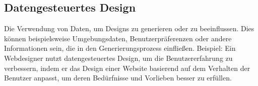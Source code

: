 \subsection*{Datengesteuertes Design}
Die Verwendung von Daten, um Designs zu generieren oder zu beeinflussen. Dies können beispielsweise Umgebungsdaten, Benutzerpräferenzen oder andere Informationen sein, die in den Generierungsprozess einfließen. Beispiel: Ein Webdesigner nutzt datengesteuertes Design, um die Benutzererfahrung zu verbessern, indem er das Design einer Website basierend auf dem Verhalten der Benutzer anpasst, um deren Bedürfnisse und Vorlieben besser zu erfüllen.